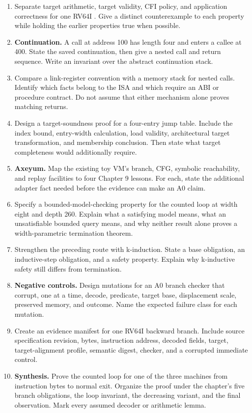 \begin{enumerate}
\item Separate target arithmetic, target validity, CFI policy, and application
correctness for one RV64I . Give a distinct counterexample to each
property while holding the earlier properties true when possible.

\item \textbf{Continuation.} A call at address 100 has length four and enters
a callee at 400. State the saved continuation, then give a nested call and
return sequence. Write an invariant over the abstract continuation stack.

\item Compare a link-register convention with a memory stack for nested
calls. Identify which facts belong to the ISA and which require an ABI or
procedure contract. Do not assume that either mechanism alone proves matching
returns.

\item Design a target-soundness proof for a four-entry jump table. Include the
index bound, entry-width calculation, load validity, architectural target
transformation, and membership conclusion. Then state what target completeness
would additionally require.

\item \textbf{Axeyum.} Map the existing toy VM's branch, CFG, symbolic
reachability, and replay facilities to four Chapter 9 lessons. For each, state
the additional adapter fact needed before the evidence can make an A0 claim.

\item Specify a bounded-model-checking property for the counted loop at width
eight and depth 260. Explain what a satisfying model means, what an
unsatisfiable bounded query means, and why neither result alone proves a
width-parametric termination theorem.

\item Strengthen the preceding route with k-induction. State a base obligation,
an inductive-step obligation, and a safety property. Explain why k-inductive
safety still differs from termination.

\item \textbf{Negative controls.} Design mutations for an A0 branch checker
that corrupt, one at a time, decode, predicate, target base, displacement
scale, preserved memory, and outcome. Name the expected failure class for each
mutation.

\item Create an evidence manifest for one RV64I backward branch. Include
source specification revision, bytes, instruction address, decoded fields,
target, target-alignment profile, semantic digest, checker, and a corrupted
immediate control.

\item \textbf{Synthesis.} Prove the counted loop for one of the three machines
from instruction bytes to normal exit. Organize the proof under the chapter's
five branch obligations, the loop invariant, the decreasing variant, and the
final observation. Mark every assumed decoder or arithmetic lemma.
\end{enumerate}
